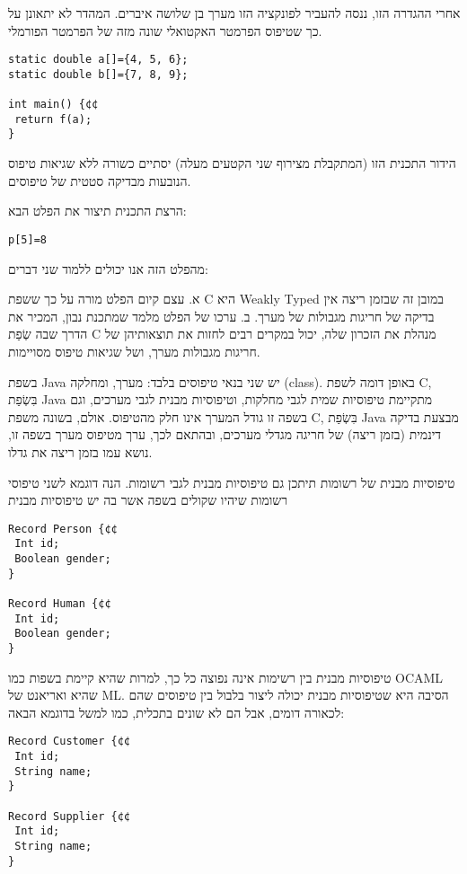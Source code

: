 \begin{טבלא}[!htbp]
      אחרי ההגדרה הזו, ננסה להעביר לפונקציה הזו מערך בן שלושה איברים. המהדר לא יתאונן על כך שטיפוס הפרמטר האקטואלי שונה מזה של הפרמטר הפורמלי.

\begin{verbatim}
static double a[]={4, 5, 6};
static double b[]={7, 8, 9};

int main() {¢¢
 return f(a);
}
\end{verbatim}

      הידור התכנית הזו (המתקבלת מצירוף שני הקטעים מעלה) יסתיים כשורה ללא שגיאות טיפוס הנובעות מבדיקה סטטית של טיפוסים.

      הרצת התכנית תיצור את הפלט הבא:

\begin{verbatim}
p[5]=8
\end{verbatim}

      מהפלט הזה אנו יכולים ללמוד שני דברים:

      א. עצם קיום הפלט מורה על כך ששפת C היא Weakly Typed במובן זה שבזמן ריצה אין בדיקה של חריגות מגבולות של מערך.
      ב. ערכו של הפלט מלמד שמתכנת נבון, המכיר את הדרך שבה שְׂפַת C מנהלת את הזכרון שלה, יכול במקרים רבים לחזות את תוצאותיהן של חריגות מגבולות מערך, ושל שגיאות טיפוס מסויימות.

      בשפת Java יש שני בנאי טיפוסים בלבד: מערך, ומחלקה (class). באופן דומה לשפת C, בִּשְׂפַת Java מתקיימת טיפוסיות שמית לגבי מחלקות, וטיפוסיות מבנית לגבי מערכים, וגם בשפה זו גודל המערך אינו חלק מהטיפוס. אולם, בשונה משפת C, בִּשְׂפַת Java מבצעת בדיקה דינמית (בזמן ריצה) של חריגה מגדלי מערכים, ובהתאם לכך, ערך מטיפוס מערך בשפה זו, נושא עמו בזמן ריצה את גדלו.

      טיפוסיות מבנית של רשומות
      תיתכן גם טיפוסיות מבנית לגבי רשומות. הנה דוגמא לשני טיפוסי רשומות שיהיו שקולים בשפה אשר בה יש טיפוסיות מבנית

\begin{verbatim}
Record Person {¢¢
 Int id;
 Boolean gender;
}

Record Human {¢¢
 Int id;
 Boolean gender;
}
\end{verbatim}

      טיפוסיות מבנית בין רשימות אינה נפוצה כל כך, למרות שהיא קיימת בשפות כמו OCAML שהיא ואריאנט של ML. הסיבה היא שטיפוסיות מבנית יכולה ליצור בלבול בין טיפוסים שהם לכאורה דומים, אבל הם לא שונים בתכלית, כמו למשל בדוגמא הבאה:

\begin{verbatim}
Record Customer {¢¢
 Int id;
 String name;
}

Record Supplier {¢¢
 Int id;
 String name;
}
\end{verbatim}


\end{טבלא}
